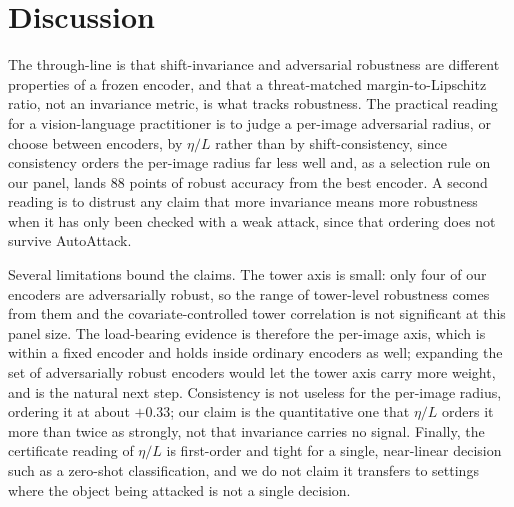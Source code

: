\documentclass{article}
\newcommand{\etaL}{\ensuremath{\eta/L}}
\begin{document}
\section{Discussion}
\label{sec:discussion}
The through-line is that shift-invariance and adversarial robustness are different properties of a
frozen encoder, and that a threat-matched margin-to-Lipschitz ratio, not an invariance metric, is what
tracks robustness. The practical reading for a vision-language practitioner is to judge a per-image
adversarial radius, or choose between encoders, by $\etaL$ rather than by shift-consistency, since
consistency orders the per-image radius far less well and, as a selection rule on our panel, lands 88
points of robust accuracy from the best encoder. A second reading is to distrust any claim that more
invariance means more robustness when it has only been checked with a weak attack, since that ordering
does not survive AutoAttack.

Several limitations bound the claims. The tower axis is small: only four of our encoders are
adversarially robust, so the range of tower-level robustness comes from them and the covariate-controlled
tower correlation is not significant at this panel size. The load-bearing evidence is therefore the
per-image axis, which is within a fixed encoder and holds inside ordinary encoders as well; expanding
the set of adversarially robust encoders would let the tower axis carry more weight, and is the natural
next step. Consistency is not useless for the per-image radius, ordering it at about $+0.33$; our claim
is the quantitative one that $\etaL$ orders it more than twice as strongly, not that invariance carries
no signal. Finally, the certificate reading of $\etaL$ is first-order and tight for a single, near-linear
decision such as a zero-shot classification, and we do not claim it transfers to settings where the
object being attacked is not a single decision.



\end{document}

